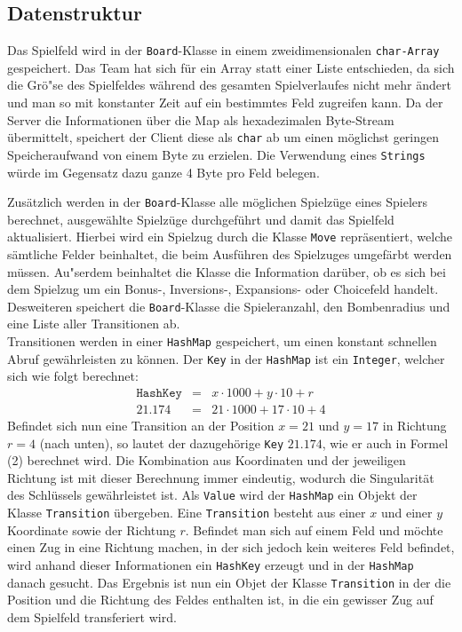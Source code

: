 \newpage

\subsection{Datenstruktur}\label{subsec:datenstruktur}
Das Spielfeld wird in der \texttt{Board}-Klasse in einem zweidimensionalen \texttt{char-Array} gespeichert.
Das Team hat sich f\"ur ein Array statt einer Liste entschieden, da sich die Gr\"o"se des Spielfeldes w\"ahrend des gesamten Spielverlaufes nicht mehr \"andert und man so mit konstanter Zeit auf ein bestimmtes Feld zugreifen kann.
Da der Server die Informationen \"uber die Map als hexadezimalen Byte-Stream \"ubermittelt, speichert der Client diese als \texttt{char} ab um einen m\"oglichst geringen Speicheraufwand von einem Byte zu erzielen.
Die Verwendung eines \texttt{Strings} w\"urde im Gegensatz dazu ganze 4 Byte pro Feld belegen.

Zus\"atzlich werden in der \texttt{Board}-Klasse alle m\"oglichen Spielz\"uge eines Spielers berechnet, ausgew\"ahlte Spielz\"uge durchgef\"uhrt und damit das Spielfeld aktualisiert.
Hierbei wird ein Spielzug durch die Klasse \texttt{Move} repr\"asentiert, welche s\"amtliche Felder beinhaltet, die beim Ausf\"uhren des Spielzuges umgef\"arbt werden m\"ussen.
Au"serdem beinhaltet die Klasse die Information dar\"uber, ob es sich bei dem Spielzug um ein Bonus-, Inversions-, Expansions- oder Choicefeld handelt.
Desweiteren speichert die \texttt{Board}-Klasse die Spieleranzahl, den Bombenradius und eine Liste aller Transitionen ab. \\
Transitionen werden in einer \texttt{HashMap} gespeichert, um einen konstant schnellen Abruf gew\"ahr\-leisten zu k\"onnen.
Der \texttt{Key} in der \texttt{HashMap} ist ein \texttt{Integer}, welcher sich wie folgt berechnet:
\begin{align}
    \texttt{HashKey} &=& x \cdot 1000 + y \cdot 10 + r \\
    21.174 &=& 21 \cdot 1000 + 17 \cdot 10 + 4
\end{align}
Befindet sich nun eine Transition an der Position $x=21$ und $y=17$ in Richtung $r=4$ (nach unten), so lautet der dazugeh\"orige \texttt{Key} $21.174$, wie er auch in Formel (2) berechnet wird.
Die Kombination aus Koordinaten und der jeweiligen Richtung ist mit dieser Berechnung immer eindeutig, wodurch die Singularit\"at des Schl\"ussels gew\"ahrleistet ist.
Als \texttt{Value} wird der \texttt{HashMap} ein Objekt der Klasse \texttt{Transition} \"ubergeben.
Eine \texttt{Transition} besteht aus einer $x$ und einer $y$ Koordinate sowie der Richtung $r$.
Befindet man sich auf einem Feld und m\"ochte einen Zug in eine Richtung machen, in der sich jedoch kein weiteres Feld befindet, wird anhand dieser Informationen ein \texttt{HashKey} erzeugt und in der \texttt{HashMap} danach gesucht.
Das Ergebnis ist nun ein Objet der Klasse \texttt{Transition} in der die Position und die Richtung des Feldes enthalten ist, in die ein gewisser Zug auf dem Spielfeld transferiert wird.

